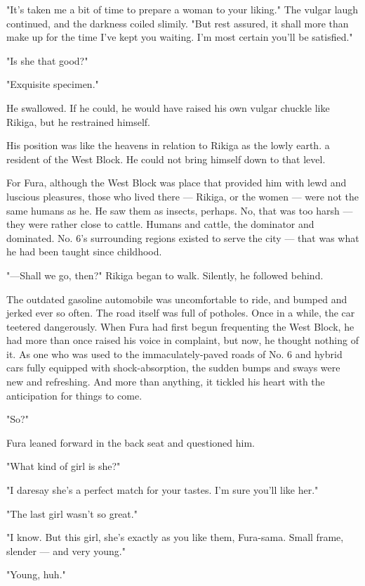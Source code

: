 "It's taken me a bit of time to prepare a woman to your liking." The
vulgar laugh continued, and the darkness coiled slimily. "But rest
assured, it shall more than make up for the time I've kept you waiting.
I'm most certain you'll be satisfied."

"Is she that good?"

"Exquisite specimen."

He swallowed. If he could, he would have raised his own vulgar chuckle
like Rikiga, but he restrained himself.

His position was like the heavens in relation to Rikiga as the lowly
earth. a resident of the West Block. He could not bring himself down to
that level.

For Fura, although the West Block was place that provided him with lewd
and luscious pleasures, those who lived there --- Rikiga, or the women ---
were not the same humans as he. He saw them as insects, perhaps. No,
that was too harsh --- they were rather close to cattle. Humans and
cattle, the dominator and dominated. No. 6's surrounding regions existed
to serve the city --- that was what he had been taught since childhood.

"---Shall we go, then?" Rikiga began to walk. Silently, he followed
behind.

\mybreak

The outdated gasoline automobile was uncomfortable to ride, and bumped
and jerked ever so often. The road itself was full of potholes. Once in
a while, the car teetered dangerously. When Fura had first begun
frequenting the West Block, he had more than once raised his voice in
complaint, but now, he thought nothing of it. As one who was used to the
immaculately-paved roads of No. 6 and hybrid cars fully equipped with
shock-absorption, the sudden bumps and sways were new and refreshing.
And more than anything, it tickled his heart with the anticipation for
things to come.

"So?"

Fura leaned forward in the back seat and questioned him.

"What kind of girl is she?"

"I daresay she's a perfect match for your tastes. I'm sure you'll like
her."

"The last girl wasn't so great."

"I know. But this girl, she's exactly as you like them, Fura-sama. Small
frame, slender --- and very young."

"Young, huh."

